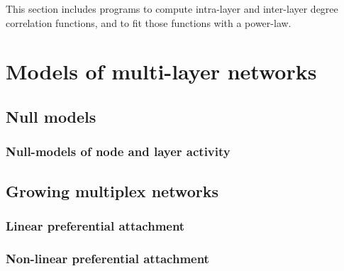\documentclass[a4paper,11pt]{book}
\begin{document}
This section includes programs to compute intra-layer and inter-layer
degree correlation functions, and to fit those functions with a
power-law.







\chapter{Models of multi-layer networks}

\section{Null models}

\subsection{Null-models of node and layer activity}







\section{Growing multiplex networks}

\subsection{Linear preferential attachment}






\subsection{Non-linear preferential attachment}
\end{document}
